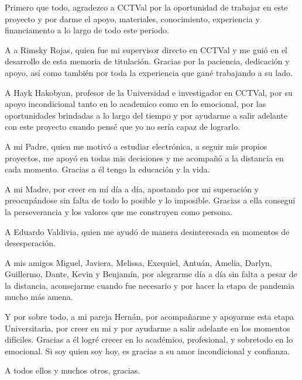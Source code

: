 
Primero que todo, agradezco a CCTVal por la oportunidad de trabajar en este proyecto y por darme el apoyo, materiales, conocimiento, experiencia y financiamento a lo largo de todo este periodo.

A a Rimsky Rojas, quien fue mi supervisor directo en CCTVal y me guió en el desarrollo de esta memoria de titulación. Gracias por la paciencia, dedicación y apoyo, así como también por toda la experiencia que gané trabajando a su lado.
 
A Hayk Hakobyan, profesor de la Universidad e investigador en CCTVal, por su apoyo incondicional tanto en lo academico como en lo emocional, por las oportunidades brindadas a lo largo del tiempo y por ayudarme a salir adelante con este proyecto cuando pensé que yo no sería capaz de lograrlo.

A mi Padre, quien me motivó a estudiar electrónica, a seguir mis propios proyectos, me apoyó en todas mis decisiones y me acompañó a la distancia en cada momento. Gracias a él tengo la educación y la vida.

A mi Madre, por creer en mí día a día, apostando por mi superación y preocupándose sin falta de todo lo posible y lo imposible. Gracias a ella conseguí la perseverancia y los valores que me construyen como persona.

A Eduardo Valdivia, quien me ayudó de manera desinteresada en momentos de desesperación.

A mis amigos Miguel, Javiera, Melissa, Exequiel, Antuán,  Amelia, Darlyn, Guillermo, Dante, Kevin y Benjamín, por alegrarme día a día sin falta a pesar de la distancia, aconsejarme cuando fue necesario y por hacer la etapa de pandemia mucho más amena.

Y por sobre todo, a mi pareja Hernán, por acompañarme y apoyarme esta etapa Universitaria, por creer en mi y por ayudarme a salir adelante en los momentos difíciles. Gracias a él logré crecer en lo académico, profesional, y sobretodo en lo emocional. Si soy quien soy hoy, es gracias a su amor incondicional y confianza.\\

\begin{flushright}
	A todos ellos y muchos otros, gracias.
\end{flushright}

